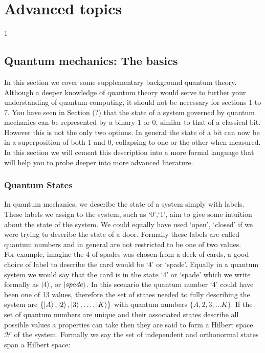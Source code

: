 \section{Advanced topics}\label{Advancedtopics}
1
\subsection{Quantum mechanics: The basics}

In this section we cover some supplementary background quantum theory. Although a deeper knowledge of quantum theory would serve to further your understanding of quantum computing, it should not be necessary for sections 1 to 7. You have seen in Section (?) that the state of a system governed by quantum mechanics can be represented by a binary 1 or 0, similar to that of a classical bit. However this is not the only two options. In general the state of a bit can now be in a superposition of both 1 and 0, collapsing to one or the other when measured. In this section we will cement this description into a more formal language that will help you to probe deeper into more advanced literature.

\subsubsection{Quantum States}

In quantum mechanics, we describe the state of a system simply with labels. These labels we assign to the system, such as {`0',`1'}, aim to give some intuition about the state of the system. We could equally have used {`open', `closed'} if we were trying to describe the state of a door. Formally these labels are called quantum numbers and in general are not restricted to be one of two values.\\

For example, imagine the 4 of spades was chosen from a deck of cards, a good choice of label to describe the card would be `4' or `spade'. Equally in a quantum system we would say that the card is in the state `4' or `spade' which we write formally as $\left\vert{4}\right\rangle$, or $\left\vert{spade}\right\rangle$. In this scenario the quantum number `4' could have been one of 13 values, therefore the set of states needed to fully describing the system are $\{\left\vert{A}\right\rangle, \left\vert{2}\right\rangle, \left\vert{3}\right\rangle,\ldots ,\left\vert{K}\right\rangle\}$ with quantum numbers $\{A,2,3,\ldots K\}$. If the set of quantum numbers are unique and their associated states describe all possible values a properties can take then they are said to form a Hilbert space $\mathcal{H}$ of the system. Formally we say the set of independent and orthonormal states span a Hilbert space:


